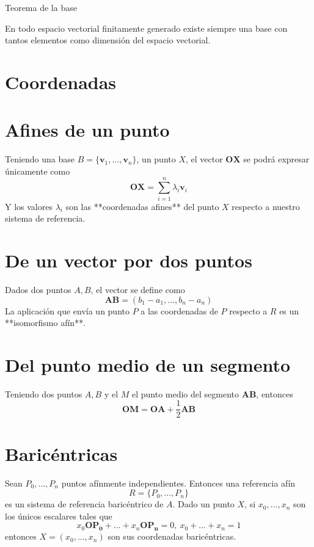 \documentclass{./Geometria.tex}
\begin{document}
\begin{teorema}
Teorema de la base

En todo espacio vectorial finitamente generado existe siempre una base con tantos elementos como dimensión del espacio vectorial.
\end{teorema}

\section{Coordenadas}
\section{Afines de un punto}
Teniendo una base $B=\{ \mathbf{v}_{1},\dots,\mathbf{v}_{n} \}$, un punto $X$, el vector $\mathbf{OX}$ se podrá expresar únicamente como
$$
\mathbf{OX}=\sum_{i=1}^n\lambda_{i}\mathbf{v}_{i}
$$
Y los valores $\lambda_{i}$ son las **coordenadas afines** del punto $X$ respecto a nuestro sistema de referencia.
\section{De un vector por dos puntos}
Dados dos puntos $A,B$, el vector se define como
$$
\mathbf{AB}=(b_{1}-a_{1},\dots,b_{n}-a_{n})
$$
La aplicación  que envía un punto $P$ a las coordenadas de $P$ respecto a $R$ es un **isomorfismo afín**.
\section{Del punto medio de un segmento}
Teniendo dos puntos $A,B$ y el $M$ el punto medio del segmento $\mathbf{AB}$, entonces
$$
\mathbf{OM}=\mathbf{OA}+\frac{1}{2}\mathbf{AB}
$$
\section{Baricéntricas}
Sean $P_{0},\dots,P_{n}$ puntos afínmente independientes. Entonces una referencia afín
$$
R=\{ P_{0},\dots,P_{n} \}
$$
es un sistema de referencia baricéntrico de $A$. Dado un punto $X$, si $x_{0},\dots,x_{n}$ son los únicos escalares tales que
$$
x_{0}\mathbf{OP_{0}}+\dots+x_{n}\mathbf{OP_{n}}=0,~ x_{0}+\dots+x_{n}=1
$$
entonces $X=(x_{0},\dots,x_{n})$ son sus coordenadas baricéntricas.
\end{document}
